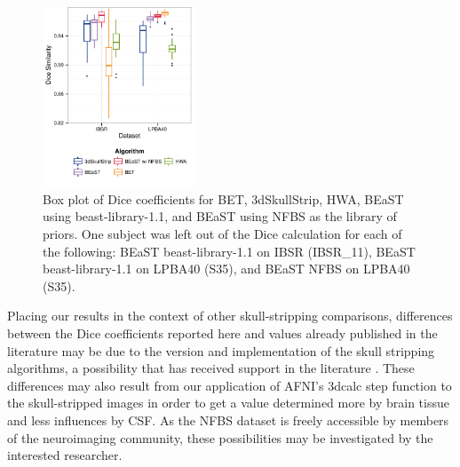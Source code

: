 \begin{figure}[ht!]
\includegraphics[width=0.4\textwidth]{boxplot_IL.pdf}
    \caption{\DIFdelbeginFL %
\DIFdelendFL \DIFaddbeginFL {}
\DIFaddendFL Box plot of Dice coefficients for BET, 3dSkullStrip, HWA, BEaST using beast-library-1.1, and BEaST using NFBS as the library of priors. One subject was left out of the Dice calculation for each of the following: BEaST \DIFdelbeginFL {}\DIFdelendFL \DIFaddbeginFL {}\DIFaddendFL beast-library-1.1 on IBSR (IBSR\_11), BEaST \DIFdelbeginFL {}\DIFdelendFL \DIFaddbeginFL {}\DIFaddendFL beast-library-1.1 on LPBA40 (S35), and BEaST \DIFdelbeginFL {}\DIFdelendFL \DIFaddbeginFL {}\DIFaddendFL NFBS on LPBA40 (S35).}
\label{fig:boxplot_I&L}
\end{figure}

Placing our results in the context of other skull-stripping comparisons, differences between the Dice coefficients reported here and values already published in the literature may be due to the version and implementation of the skull stripping algorithms, a possibility that has received support in the literature \cite{Iglesias2011}. These differences may also result from our application of AFNI's 3dcalc step function to the skull-stripped images in order to get a value determined more by brain tissue and less influences by CSF. As the NFBS dataset is freely accessible by members of the neuroimaging community, these possibilities may be investigated by the interested researcher.

\DIFdelbegin \section*{}
\DIFdelend \DIFaddbegin \subsection*{}

